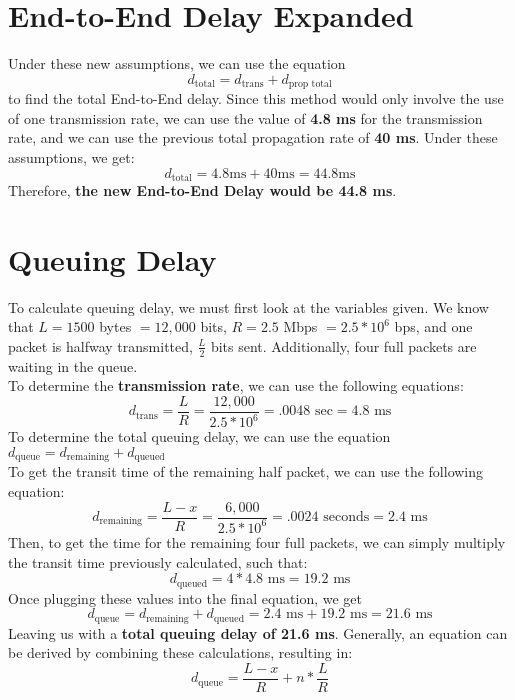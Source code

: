\documentclass{article}
\begin{document}
\section{End-to-End Delay Expanded}
Under these new assumptions, we can use the equation
\[
d_{\text{total}} = d_{\text{trans}} + d_{\text{prop total}} 
\]
to find the total End-to-End delay. Since this method would only involve the use of one transmission rate, we can use the value of \textbf{4.8 ms} for the transmission rate, and we can use the previous total propagation rate of \textbf{40 ms}. Under these assumptions, we get:
\[
d_{\text{total}} = 4.8 \text{ms} + 40 \text{ms} = 44.8 \text{ms} 
\]
Therefore, \textbf{the new End-to-End Delay would be 44.8 ms}.

\section{Queuing Delay}
To calculate queuing delay, we must first look at the variables given. We know that $L = 1500 $ bytes $= 12,000$ bits, $R = 2.5$ Mbps $= 2.5 * 10^6$ bps, and one packet is halfway transmitted, $\frac{L}{2}$ bits sent. Additionally, four full packets are waiting in the queue. \\
To determine the \textbf{transmission rate}, we can use the following equations:
\[
d_{\text{trans}} = \frac{L}{R} = \frac{12,000}{2.5*10^6} = .0048 \text{ sec} = 4.8 \text{ ms}
\]
To determine the total queuing delay, we can use the equation $d_{\text{queue}} = d_{\text{remaining}} + d_{\text{queued}}$\\
To get the transit time of the remaining half packet, we can use the following equation:
\[
d_{\text{remaining}} = \frac{L-x}{R} = \frac{6,000}{2.5*10^6} = .0024 \text{ seconds} = 2.4 \text{ ms}
\]
Then, to get the time for the remaining four full packets, we can simply multiply the transit time previously calculated, such that:
\[
d_{\text{queued}} = 4 * 4.8 \text{ ms} = 19.2 \text{ ms}
\]
Once plugging these values into the final equation, we get 
\[
d_{\text{queue}} = d_{\text{remaining}} + d_{\text{queued}} = 2.4 \text{ ms} + 19.2 \text{ ms} = 21.6 \text{ ms}
\]
Leaving us with a \textbf{total queuing delay of 21.6 ms}. Generally, an equation can be derived by combining these calculations, resulting in:
\[
d_{\text{queue}} = \frac{L-x}{R} + n * \frac{L}{R}
\]

\setcounter{section}{19}\
\end{document}
